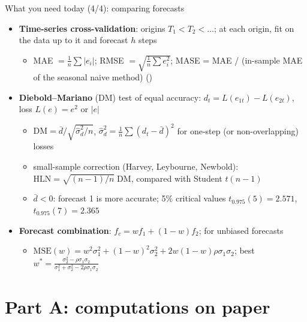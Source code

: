 \begin{frame}{What you need today (4/4): comparing forecasts}
\itemsize{\footnotesize}
\begin{itemize}
    \item \textbf{Time-series cross-validation}: origins $T_1 < T_2 < \dots$; at each origin, fit on the data up to it and forecast $h$ steps
    \begin{itemize}
        \item MAE $= \frac1n\sum|e_i|$; RMSE $= \sqrt{\frac1n\sum e_i^2}$; MASE = MAE / (in-sample MAE of the seasonal naive method) ()
    \end{itemize}
    \item \textbf{Diebold--Mariano} (DM) test of equal accuracy: $d_t = L(e_{1t}) - L(e_{2t})$, loss $L(e) = e^2$ or $|e|$
    \begin{itemize}
        \item $\mathrm{DM} = \bar d/\sqrt{\hat\sigma_d^2/n}$, $\hat\sigma_d^2 = \frac1n\sum(d_t - \bar d)^2$ for one-step (or non-overlapping) losses
        \item small-sample correction (Harvey, Leybourne, Newbold): $\mathrm{HLN} = \sqrt{(n - 1)/n}\;\mathrm{DM}$, compared with Student $t(n - 1)$
        \item $\bar d < 0$: forecast 1 is more accurate; 5\% critical values $t_{0.975}(5) = 2.571$, $t_{0.975}(7) = 2.365$
    \end{itemize}
    \item \textbf{Forecast combination}: $f_c = w f_1 + (1 - w)f_2$; for unbiased forecasts
    \begin{itemize}
        \item $\mathrm{MSE}(w) = w^2\sigma_1^2 + (1 - w)^2\sigma_2^2 + 2w(1 - w)\rho\sigma_1\sigma_2$; best $w^* = \frac{\sigma_2^2 - \rho\sigma_1\sigma_2}{\sigma_1^2 + \sigma_2^2 - 2\rho\sigma_1\sigma_2}$
    \end{itemize}
\end{itemize}
\end{frame}


\section{Part A: computations on paper}


